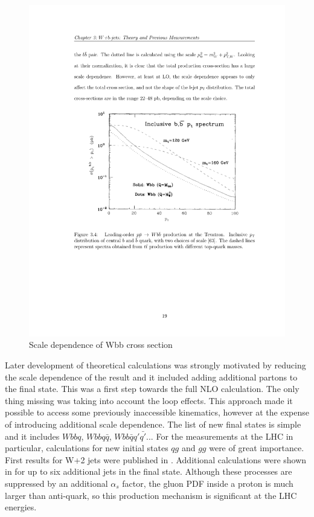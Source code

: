 \begin{figure}[htbp]
	\centering
		\includegraphics{Figures/scale_dep.pdf}
	\caption[Scale dependence of Wbb cross section]{Scale dependence of Wbb cross section}
	\label{fig:scale_dep}
\end{figure}
\par Later development of theoretical calculations was strongly motivated by reducing the scale dependence of the result and it included adding additional partons to the final state. This was a first step towards the full NLO calculation. The only thing missing was taking into account the loop effects. This approach made it possible to access some previously inaccessible kinematics, however at the expense of introducing additional scale dependence. The list of new final states is simple and it includes $Wbbq$, $Wbbq\bar{q}$, $Wbb\bar{q}q'\bar{q'}$... For the measurements at the LHC in particular, calculations for new initial states $qg$ and $gg$ were of great importance. First results for W+2 jets were published in \cite{Ellis:1998fv}. Additional calculations were shown in \cite{Mangano:2001xp} for up to six additional jets in the final state. Although these processes are suppressed by an additional $\alpha_s$ factor, the gluon PDF inside a proton is much larger than anti-quark, so this production mechanism is significant at the LHC energies. 
